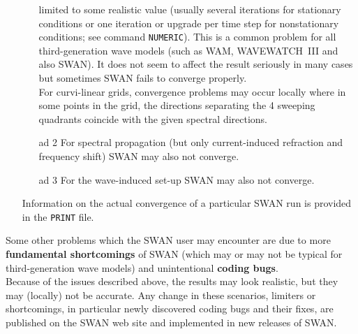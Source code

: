 \documentclass[12pt]{book}
\begin{document}
\begin{itemize}
\begin{itemize}
                       limited to some realistic value (usually several iterations for stationary
                       conditions or one iteration or upgrade per time step for nonstationary
                       conditions; see command {\tt NUMERIC}). This is a common problem for all
                       third-generation wave models (such as WAM, WAVEWATCH~III and also SWAN). It
                       does not seem to affect the result seriously in many cases but sometimes
                       SWAN fails to converge properly.
                       \\[2ex]
                       \noindent
                       For curvi-linear grids, convergence problems may occur locally where in some
                       points in the grid, the directions separating the 4 sweeping quadrants coincide
                       with the given spectral directions.
           \item[ad 2] For spectral propagation (but only current-induced refraction and frequency
                       shift) SWAN may also not converge.
           \item[ad 3] For the wave-induced set-up SWAN may also not converge.
         \end{itemize}
         Information on the actual convergence of a particular SWAN run is provided in the {\tt PRINT} file.
\end{itemize}
Some other problems which the SWAN user may encounter are due to more {\bf fundamental shortcomings}
of SWAN (which may or may not be typical for third-generation wave models) and unintentional {\bf coding
bugs}.
\\[2ex]
\noindent
Because of the issues described above, the results may look realistic, but they may (locally) not be
accurate. Any change in these scenarios, limiters or shortcomings, in particular newly discovered coding
bugs and their fixes, are published on the SWAN web site and implemented in new releases of SWAN.
\end{document}
